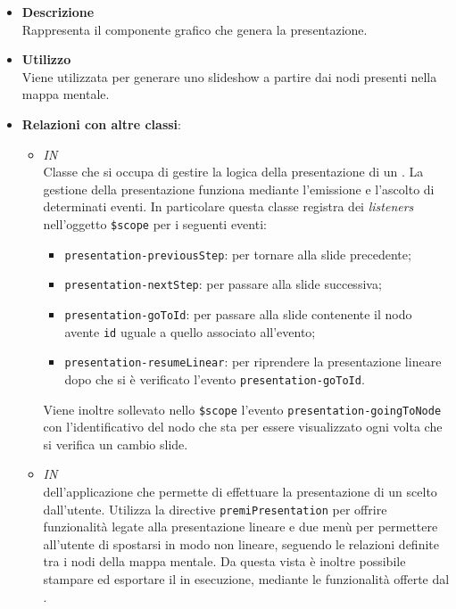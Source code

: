 \begin{itemize}
\item \textbf{Descrizione}\\
Rappresenta il componente grafico che genera la presentazione.
\item \textbf{Utilizzo}\\
Viene utilizzata per generare uno slideshow a partire dai nodi presenti nella mappa mentale.
\item \textbf{Relazioni con altre classi}:
\begin{itemize}
\item \textit{IN} \hyperref[\nogloxy{Premi::Front-End::Controllers::PresentationController}]{}\\
Classe che si occupa di gestire la logica della presentazione di un . La gestione della presentazione funziona mediante l'emissione e l'ascolto di determinati eventi.
In particolare questa classe registra dei \textit{listeners} nell'oggetto \texttt{\$scope} per i seguenti eventi:
\begin{itemize}
\item \texttt{presentation-previousStep}: per tornare alla slide precedente;
\item \texttt{presentation-nextStep}: per passare alla slide successiva;
\item \texttt{presentation-goToId}: per passare alla slide contenente il nodo avente \texttt{id} uguale a quello associato all'evento;
\item \texttt{presentation-resumeLinear}: per riprendere la presentazione lineare dopo che si è verificato l'evento \texttt{presentation-goToId}.
\end{itemize}
Viene inoltre sollevato nello \texttt{\$scope} l'evento \texttt{presentation-goingToNode} con l'identificativo del nodo che sta per essere visualizzato ogni volta che si verifica un cambio slide.
\item \textit{IN} \hyperref[\nogloxy{Premi::Front-End::Views::PresentationView}]{}\\
 dell’applicazione che permette di effettuare la presentazione di un  scelto dall’utente. Utilizza la directive \texttt{premiPresentation} per offrire funzionalità legate alla presentazione lineare e due menù per permettere all'utente di spostarsi in modo non lineare, seguendo le relazioni definite tra i nodi della mappa mentale.
Da questa vista è inoltre possibile stampare ed esportare il  in esecuzione, mediante le funzionalità offerte dal .

\end{itemize}
\end{itemize}

